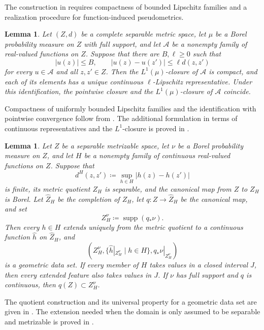 \documentclass[11pt]{amsart}
\theoremstyle{plain}
\newtheorem{lemma}[theorem]{Lemma}
\theoremstyle{definition}
\theoremstyle{remark}
\DeclareMathOperator{\supp}{supp}
\begin{document}
The construction in  requires compactness of bounded Lipschitz families and a realization procedure for function-induced pseudometrics.

\begin{lemma}
\label{lem:bounded-lipschitz-compactness}
Let $(Z,d)$ be a complete separable metric space, let $\mu$ be a Borel probability measure on $Z$ with full support, and let $\mathcal A$ be a nonempty family of real-valued functions on $Z$. Suppose that there are $B,\ell\geq0$ such that
\[|u(z)|\leq B,\qquad |u(z)-u(z')|\leq\ell d(z,z')\]
for every $u\in\mathcal A$ and all $z,z'\in Z$. Then the $L^1(\mu)$-closure of $\mathcal A$ is compact, and each of its elements has a unique continuous $\ell$-Lipschitz representative. Under this identification, the pointwise closure and the $L^1(\mu)$-closure of $\mathcal A$ coincide.
\end{lemma}

Compactness of uniformly bounded Lipschitz families and the identification with pointwise convergence follow from \cite[Lemma~2.2 and Remark~2.3]{hanika2022gds}. The additional formulation in terms of continuous representatives and the $L^1$-closure is proved in .

\begin{lemma}
\label{lem:feature-realization}
Let $Z$ be a separable metrizable space, let $\nu$ be a Borel probability measure on $Z$, and let $H$ be a nonempty family of continuous real-valued functions on $Z$. Suppose that
\[d^H(z,z')\coloneqq\sup_{h\in H}|h(z)-h(z')|\]
is finite, its metric quotient $Z_H$ is separable, and the canonical map from $Z$ to $Z_H$ is Borel. Let $\widehat Z_H$ be the completion of $Z_H$, let $q\colon Z\to\widehat Z_H$ be the canonical map, and set
\[Z_H^\nu\coloneqq\supp(q_*\nu).\]
Then every $h\in H$ extends uniquely from the metric quotient to a continuous function $\widehat h$ on $\widehat Z_H$, and
\[\left(Z_H^\nu,\{\widehat h|_{Z_H^\nu}\mid h\in H\},q_*\nu|_{Z_H^\nu}\right)\]
is a geometric data set. If every member of $H$ takes values in a closed interval $J$, then every extended feature also takes values in $J$. If $\nu$ has full support and $q$ is continuous, then $q(Z)\subset Z_H^\nu$.
\end{lemma}

The quotient construction and its universal property for a geometric data set are given in \cite[Definition~3.16, Proposition~3.17, Claim~3.18, and Proposition~3.19]{gds1}. The extension needed when the domain is only assumed to be separable and metrizable is proved in .
\end{document}
